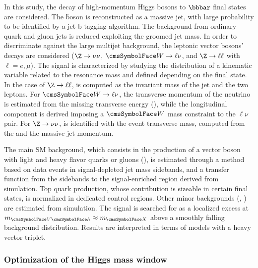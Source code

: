 In this study, the decay of high-momentum Higgs bosons to $\bbbar$ final states are considered. The \h boson is reconstructed as a massive jet, with large probability to be identified by a jet b-tagging algorithm. The background from ordinary quark and gluon jets is reduced exploiting the groomed jet mass. In order to discriminate against the large multijet background, the leptonic vector bosons' decays are considered ($\Z \to \nu\nu$, $\PW \to \ell \nu$, and $\Z \to \ell \ell$ with $\ell = e,\mu$).
The signal is characterized by studying the distribution of a kinematic variable \mVH related to the resonance mass \mX and defined depending on the final state. 
In the case of $\Z \to \ell\ell$, \mVH is computed as the invariant mass of the jet and the two leptons. For $\PW \to \ell\nu$, the transverse momentum of the neutrino is estimated from the missing transverse energy (\MET), while the longitudinal component is derived imposing a $\PW$ mass constraint to the $\ell \nu$ pair. For $\Z \to \nu\nu$, \mVH is identified with the event transverse mass, computed from the \MET and the massive-jet momentum.

The main SM background, which consists in the production of a vector boson with light and heavy flavor quarks or gluons (\Vjets), is estimated through a method based on data events in signal-depleted jet mass sidebands, and a transfer function from the sidebands to the signal-enriched region derived from simulation.
Top quark production, whose contribution is sizeable in certain final states, is normalized in dedicated control regions. Other minor backgrounds (\VV, \VH) are estimated from simulation.
The signal is searched for as a localized excess at $\mVH \approx \mX$ above a smoothly falling \mVH background distribution. Results are interpreted in terms of models with a heavy vector triplet. 


\subsubsection*{Optimization of the Higgs mass window}

